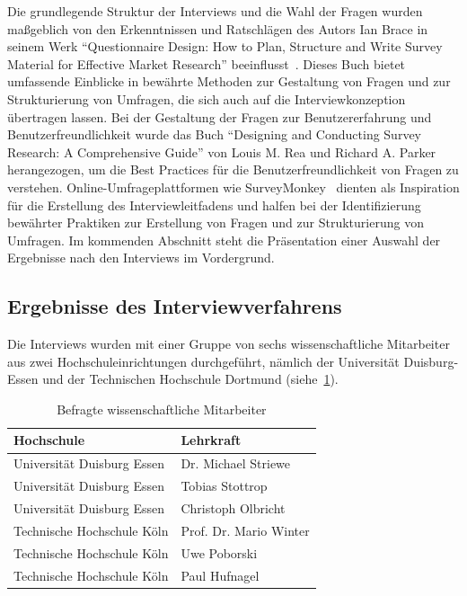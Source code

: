 Die grundlegende Struktur der Interviews und die Wahl der Fragen wurden maßgeblich von den Erkenntnissen und Ratschlägen
des Autors Ian Brace in seinem Werk ``Questionnaire Design: How to Plan, Structure and Write Survey Material for
Effective Market Research'' beeinflusst~\cite{brace2018questionnaire}. Dieses Buch bietet umfassende Einblicke in
bewährte Methoden zur Gestaltung von Fragen und zur Strukturierung von Umfragen, die sich auch auf die
Interviewkonzeption übertragen lassen. Bei der Gestaltung der Fragen zur Benutzererfahrung und Benutzerfreundlichkeit
wurde das Buch ``Designing and Conducting Survey Research: A Comprehensive Guide'' von Louis M. Rea und Richard
A. Parker~\cite{rea2014designing} herangezogen, um die Best Practices für die Benutzerfreundlichkeit von Fragen zu
verstehen. Online-Umfrageplattformen wie SurveyMonkey~\cite{monkey} dienten als Inspiration für die Erstellung des
Interviewleitfadens und halfen bei der Identifizierung bewährter Praktiken zur Erstellung von Fragen und zur
Strukturierung von Umfragen. Im kommenden Abschnitt steht die Präsentation einer Auswahl der Ergebnisse nach den
Interviews im Vordergrund.


\subsection{Ergebnisse des Interviewverfahrens}

Die Interviews wurden mit einer Gruppe von sechs wissenschaftliche Mitarbeiter aus zwei Hochschuleinrichtungen
durchgeführt, nämlich der Universität Duisburg-Essen und der Technischen Hochschule Dortmund (siehe~\ref{tab:personnen}).

\begin{table}
    \centering
    \caption{Befragte wissenschaftliche Mitarbeiter} \label{tab:personnen}
    \begin{adjustbox}{scale=0.9}
        \begin{tabular}{ll}
            \toprule
            \textbf{Hochschule} & \textbf{Lehrkraft} \\
            \midrule
            Universität Duisburg Essen & Dr. Michael Striewe \\
            \midrule
            Universität Duisburg Essen & Tobias Stottrop \\
            \midrule
            Universität Duisburg Essen & Christoph Olbricht \\
            \midrule
            Technische Hochschule Köln & Prof. Dr. Mario Winter \\
            \midrule
            Technische Hochschule Köln & Uwe Poborski \\
            \midrule
            Technische Hochschule Köln & Paul Hufnagel \\
            \bottomrule
        \end{tabular}
    \end{adjustbox}
\end{table}

